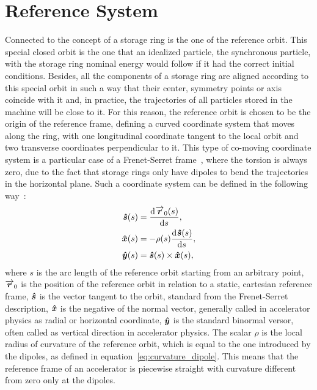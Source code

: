 \section{Reference System}

    Connected to the concept of a storage ring is the one of the reference orbit. This special closed orbit is the one that an idealized particle, the synchronous particle, with the storage ring nominal energy would follow if it had the correct initial conditions. Besides, all the components of a storage ring are aligned according to this special orbit in such a way that their center, symmetry points or axis coincide with it and, in practice, the trajectories of all particles stored in the machine will be close to it. For this reason, the reference orbit is chosen to be the origin of the reference frame, defining a curved coordinate system that moves along the ring, with one longitudinal coordinate tangent to the local orbit and two transverse coordinates perpendicular to it. This type of co-moving coordinate system is a particular case of a Frenet-Serret frame~\cite{Frenet1847,Serret1851,wikipedia}, where the torsion is always zero, due to the fact that storage rings only have dipoles to bend the trajectories in the horizontal plane. Such a coordinate system can be defined in the following way~\cite{LeeBook}:
    \begin{align}\nonumber
        \boldsymbol{\hat s}(s) &= \frac{\mathrm{d}^{{}}\overrightarrow{\boldsymbol{r}}_0(s)}{\mathrm{d} s^{{}}},\\
        \boldsymbol{\hat x}(s) &= -\rho(s)\frac{\mathrm{d}^{{}}\boldsymbol{\hat s}(s)}{\mathrm{d} s^{{}}},\\\nonumber
        \boldsymbol{\hat y}(s) &= \boldsymbol{\hat s}(s) \times \boldsymbol{\hat x}(s),
    \end{align}
    where $s$ is the arc length of the reference orbit starting from an arbitrary point, $\overrightarrow{\boldsymbol{r}}_0$ is the position of the reference orbit in relation to a static, cartesian reference frame, $\boldsymbol{\hat s}$ is the vector tangent to the orbit, standard from the Frenet-Serret description, $\boldsymbol{\hat x}$ is the negative of the normal vector, generally called in accelerator physics as radial or horizontal coordinate, $\boldsymbol{\hat y}$ is the standard binormal versor, often called as vertical direction in accelerator physics. The scalar $\rho$ is the local radius of curvature of the reference orbit, which is equal to the one introduced by the dipoles, as defined in equation~\eqref{eq:curvature_dipole}. This means that the reference frame of an accelerator is piecewise straight with curvature different from zero only at the dipoles.

